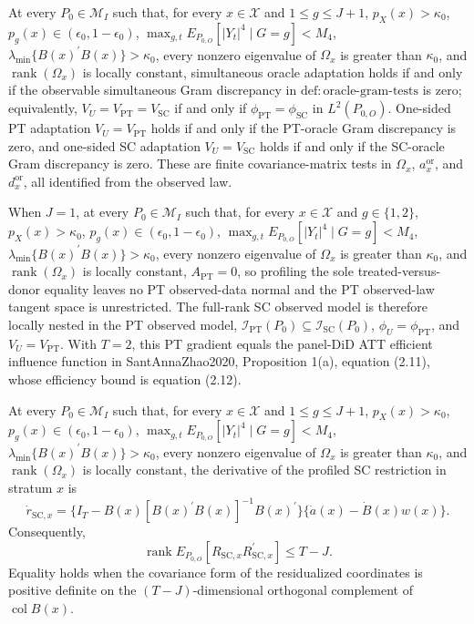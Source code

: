 At every \(P_0\in\mathcal M_I\) such that, for every \(x\in\mathcal X\) and \(1\le g\le J+1\), \(p_X(x)>\kappa_0\), \(p_g(x)\in(\epsilon_0,1-\epsilon_0)\), \(\max_{g,t}E_{P_{0,O}}[|Y_t|^4\mid G=g]<M_4\), \(\lambda_{\min}\{B(x)^{\prime}B(x)\}>\kappa_0\), every nonzero eigenvalue of \(\Omega_x\) is greater than \(\kappa_0\), and \(\operatorname{rank}(\Omega_x)\) is locally constant, simultaneous oracle adaptation holds if and only if the observable simultaneous Gram discrepancy in \(\mathrm{def{:}oracle\text{-}gram\text{-}tests}\) is zero; equivalently, \(V_U=V_{\mathrm{PT}}=V_{\mathrm{SC}}\) if and only if \(\phi_{\mathrm{PT}}=\phi_{\mathrm{SC}}\) in \(L^2(P_{0,O})\). One-sided PT adaptation \(V_U=V_{\mathrm{PT}}\) holds if and only if the PT-oracle Gram discrepancy is zero, and one-sided SC adaptation \(V_U=V_{\mathrm{SC}}\) holds if and only if the SC-oracle Gram discrepancy is zero. These are finite covariance-matrix tests in \(\Omega_x\), \(a_x^{\mathrm{or}}\), and \(d_x^{\mathrm{or}}\), all identified from the observed law.

When \(J=1\), at every \(P_0\in\mathcal M_I\) such that, for every \(x\in\mathcal X\) and \(g\in\{1,2\}\), \(p_X(x)>\kappa_0\), \(p_g(x)\in(\epsilon_0,1-\epsilon_0)\), \(\max_{g,t}E_{P_{0,O}}[|Y_t|^4\mid G=g]<M_4\), \(\lambda_{\min}\{B(x)^{\prime}B(x)\}>\kappa_0\), every nonzero eigenvalue of \(\Omega_x\) is greater than \(\kappa_0\), and \(\operatorname{rank}(\Omega_x)\) is locally constant, \(A_{\mathrm{PT}}=0\), so profiling the sole treated-versus-donor equality leaves no PT observed-data normal and the PT observed-law tangent space is unrestricted. The full-rank SC observed model is therefore locally nested in the PT observed model, \(\mathcal I_{\mathrm{PT}}(P_0)\subseteq\mathcal I_{\mathrm{SC}}(P_0)\), \(\phi_U=\phi_{\mathrm{PT}}\), and \(V_U=V_{\mathrm{PT}}\). With \(T=2\), this PT gradient equals the panel-DiD ATT efficient influence function in SantAnnaZhao2020, Proposition 1(a), equation (2.11), whose efficiency bound is equation (2.12).

At every \(P_0\in\mathcal M_I\) such that, for every \(x\in\mathcal X\) and \(1\le g\le J+1\), \(p_X(x)>\kappa_0\), \(p_g(x)\in(\epsilon_0,1-\epsilon_0)\), \(\max_{g,t}E_{P_{0,O}}[|Y_t|^4\mid G=g]<M_4\), \(\lambda_{\min}\{B(x)^{\prime}B(x)\}>\kappa_0\), every nonzero eigenvalue of \(\Omega_x\) is greater than \(\kappa_0\), and \(\operatorname{rank}(\Omega_x)\) is locally constant, the derivative of the profiled SC restriction in stratum \(x\) is
\[
\dot r_{\mathrm{SC},x}
=\{I_T-B(x)[B(x)^{\prime}B(x)]^{-1}B(x)^{\prime}\}
\{\dot a(x)-\dot B(x)w(x)\}.
\]
Consequently,
\[
\operatorname{rank}E_{P_{0,O}}[R_{\mathrm{SC},x}R_{\mathrm{SC},x}^{\prime}]
\le T-J.
\]
Equality holds when the covariance form of the residualized coordinates is positive definite on the \((T-J)\)-dimensional orthogonal complement of \(\operatorname{col}B(x)\).

